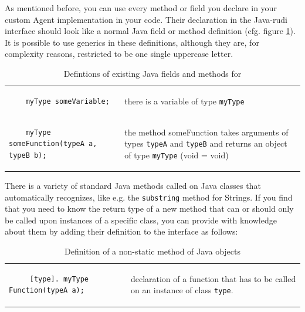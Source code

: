 As mentioned before, you can use every method or field you declare in your custom Agent implementation in your \vonda code. Their declaration in the Java-rudi interface should look like a normal Java field or method definition (cfg. figure \ref{tab:javadef}). It is possible to use generics in these definitions, although they are, for complexity reasons, restricted to be one single uppercase letter.

\begin{table}[htbp]
  \small
  \begin{tabular}{lp{}}
    \begin{lstlisting}
    myType someVariable;
    \end{lstlisting}
    &  there is a variable of type \texttt{myType} \\

    \begin{lstlisting}
    myType someFunction(typeA a, typeB b);
    \end{lstlisting}
    &  the method someFunction takes arguments of types \texttt{typeA} and
      \texttt{typeB} and returns an object of type \texttt{myType} (void =
      void)
  \end{tabular}

  \caption{Defintions of existing Java fields and methods for \vonda}
  \label{tab:javadef}
\end{table}

There is a variety of standard Java methods called on Java classes that \vonda automatically recognizes, like e.g. the \texttt{substring} method for Strings. If you find that you need \vonda to know the return type of a new method that can or should only be called upon instances of a specific class, you can provide \vonda with knowledge about them by adding their definition to the interface as follows:


\begin{table}[htbp]
  \centering
  \small
  \begin{tabular}{lp{}}

    \begin{lstlisting}
     [type]. myType Function(typeA a);
    \end{lstlisting}
    & declaration of a function that has to be called on an instance of class \texttt{type}.
  \end{tabular}

  \caption{Definition of a non-static method of Java objects}
  \label{tab:methoddef}
\end{table}

